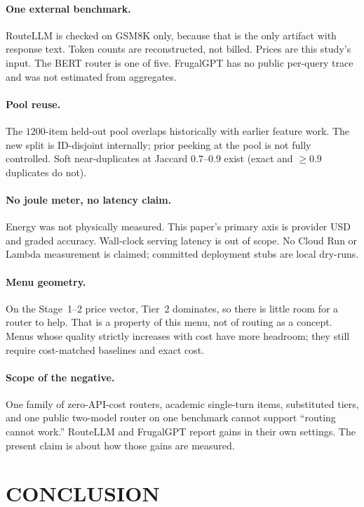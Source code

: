 \documentclass[a4paper,twoside]{article}
\begin{document}
\paragraph{One external benchmark.}
RouteLLM is checked on GSM8K only, because that is the only artifact with response text. Token counts are reconstructed, not billed. Prices are this study's input. The BERT router is one of five. FrugalGPT has no public per-query trace and was not estimated from aggregates.

\paragraph{Pool reuse.}
The $1200$-item held-out pool overlaps historically with earlier feature work. The new split is ID-disjoint internally; prior peeking at the pool is not fully controlled. Soft near-duplicates at Jaccard $0.7$--$0.9$ exist (exact and $\ge 0.9$ duplicates do not).

\paragraph{No joule meter, no latency claim.}
Energy was not physically measured. This paper's primary axis is provider USD and graded accuracy. Wall-clock serving latency is out of scope. No Cloud Run or Lambda measurement is claimed; committed deployment stubs are local dry-runs.

\paragraph{Menu geometry.}
On the Stage~1--2 price vector, Tier~2 dominates, so there is little room for a router to help. That is a property of this menu, not of routing as a concept. Menus whose quality strictly increases with cost have more headroom; they still require cost-matched baselines and exact cost.

\paragraph{Scope of the negative.}
One family of zero-API-cost routers, academic single-turn items, substituted tiers, and one public two-model router on one benchmark cannot support ``routing cannot work.'' RouteLLM and FrugalGPT report gains in their own settings. The present claim is about how those gains are measured.

\section{\uppercase{Conclusion}}
\end{document}
